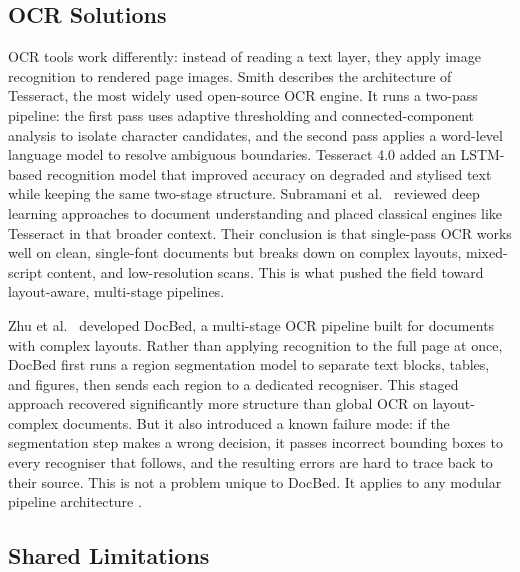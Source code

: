 \subsection{OCR Solutions}

OCR tools work differently: instead of reading a text layer, they apply image
recognition to rendered page images. Smith \autocite{smith2007} describes the
architecture of Tesseract, the most widely used open-source OCR engine. It
runs a two-pass pipeline: the first pass uses adaptive thresholding and
connected-component analysis to isolate character candidates, and the second
pass applies a word-level language model to resolve ambiguous boundaries.
Tesseract 4.0 added an LSTM-based recognition model that improved accuracy on
degraded and stylised text while keeping the same two-stage structure.
Subramani et al.\ \autocite{subramani2020} reviewed deep learning approaches to
document understanding and placed classical engines like Tesseract in that
broader context. Their conclusion is that single-pass OCR works well on clean,
single-font documents but breaks down on complex layouts, mixed-script content,
and low-resolution scans. This is what pushed the field toward layout-aware,
multi-stage pipelines.

Zhu et al.\ \autocite{zhu2022} developed DocBed, a multi-stage OCR pipeline built
for documents with complex layouts. Rather than applying recognition to the
full page at once, DocBed first runs a region segmentation model to separate
text blocks, tables, and figures, then sends each region to a dedicated
recogniser. This staged approach recovered significantly more structure than
global OCR on layout-complex documents. But it also introduced a known failure
mode: if the segmentation step makes a wrong decision, it passes incorrect
bounding boxes to every recogniser that follows, and the resulting errors are
hard to trace back to their source. This is not a problem unique to DocBed.
It applies to any modular pipeline architecture \autocite{duan2025}.

\subsection{Shared Limitations}

